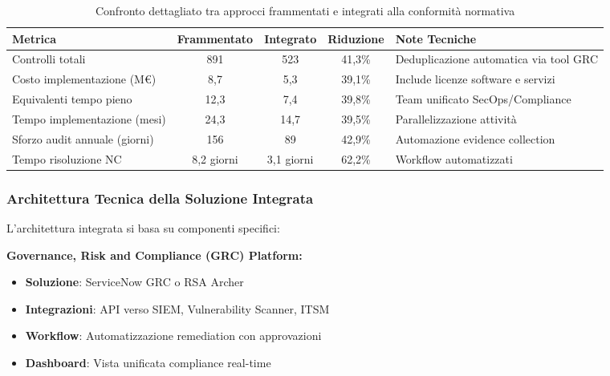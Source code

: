 \begin{table}[h]
\centering
\caption{Confronto dettagliato tra approcci frammentati e integrati alla conformità normativa}
\label{tab:confronto_compliance}
\begin{tabular}{|l|c|c|c|p{4cm}|}
\hline
\textbf{Metrica} & \textbf{Frammentato} & \textbf{Integrato} & \textbf{Riduzione} & \textbf{Note Tecniche} \\
\hline
Controlli totali & 891 & 523 & 41,3\% & Deduplicazione automatica via tool GRC \\
Costo implementazione (M€) & 8,7 & 5,3 & 39,1\% & Include licenze software e servizi \\
Equivalenti tempo pieno & 12,3 & 7,4 & 39,8\% & Team unificato SecOps/Compliance \\
Tempo implementazione (mesi) & 24,3 & 14,7 & 39,5\% & Parallelizzazione attività \\
Sforzo audit annuale (giorni) & 156 & 89 & 42,9\% & Automazione evidence collection \\
Tempo risoluzione NC & 8,2 giorni & 3,1 giorni & 62,2\% & Workflow automatizzati \\
\hline
\end{tabular}
\end{table}

\subsubsection{Architettura Tecnica della Soluzione Integrata}

L'architettura integrata si basa su componenti specifici:

\textbf{Governance, Risk and Compliance (GRC) Platform:}
\begin{itemize}
    \item \textbf{Soluzione}: ServiceNow GRC o RSA Archer
    \item \textbf{Integrazioni}: API verso SIEM, Vulnerability Scanner, ITSM
    \item \textbf{Workflow}: Automatizzazione remediation con approvazioni
    \item \textbf{Dashboard}: Vista unificata compliance real-time
\end{itemize}

